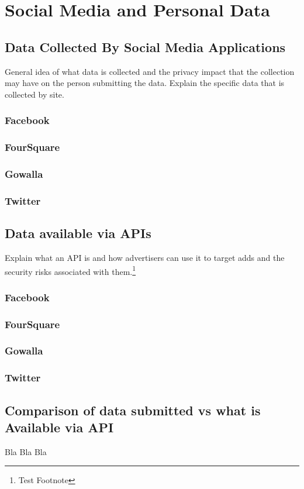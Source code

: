 \section{Social Media and Personal Data}
\subsection{Data Collected By Social Media Applications}
General idea of what data is collected and the privacy impact that the
collection may have on the person submitting the data. Explain the specific data
that is collected by site.

\subsubsection{Facebook}
\subsubsection{FourSquare}
\subsubsection{Gowalla}
\subsubsection{Twitter}

\subsection{Data available via APIs}
Explain what an API is and how advertisers can use it to target adds and the
security risks associated with them.\footnote{Test Footnote}

\subsubsection{Facebook}
\subsubsection{FourSquare}
\subsubsection{Gowalla}
\subsubsection{Twitter}

\subsection{Comparison of data submitted vs what is Available via API}
Bla Bla Bla

